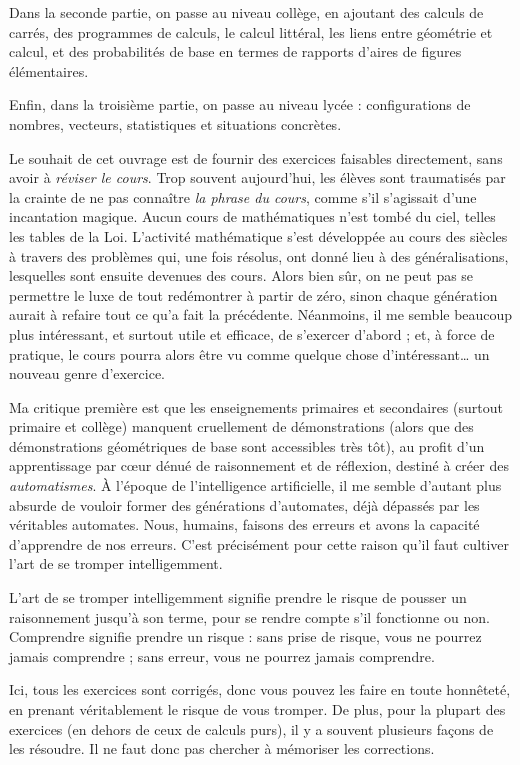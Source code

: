 \documentclass[11pt]{article}
\begin{document}
Dans la seconde partie, on passe au niveau collège, en ajoutant des
calculs de carrés, des programmes de calculs, le calcul littéral, les
liens entre géométrie et calcul, et des probabilités de base en termes
de rapports d’aires de figures élémentaires.


Enfin, dans la troisième partie, on passe au niveau lycée :
configurations de nombres, vecteurs, statistiques et situations
concrètes.


Le souhait de cet ouvrage est de fournir des exercices faisables
directement, sans avoir à \textit{réviser le cours}. Trop souvent
aujourd’hui, les élèves sont traumatisés par la crainte de ne pas
connaître \textit{la phrase du cours}, comme s’il s’agissait
d’une incantation magique. Aucun cours de mathématiques n’est tombé du
ciel, telles les tables de la Loi. L’activité mathématique s’est
développée au cours des siècles à travers des problèmes qui, une fois
résolus, ont donné lieu à des généralisations, lesquelles sont ensuite
devenues des cours. Alors bien sûr, on ne peut pas se permettre le
luxe de tout redémontrer à partir de zéro, sinon chaque génération
aurait à refaire tout ce qu’a fait la précédente. Néanmoins, il me
semble beaucoup plus intéressant, et surtout utile et efficace, de
s’exercer d’abord ; et, à force de pratique, le cours pourra alors
être vu comme quelque chose d’intéressant… un nouveau genre
d’exercice.


Ma critique première est que les enseignements primaires et
secondaires (surtout primaire et collège) manquent cruellement de
démonstrations (alors que des démonstrations géométriques de base sont
accessibles très tôt), au profit d’un apprentissage par cœur dénué de
raisonnement et de réflexion, destiné à créer des
\textit{automatismes}. À l’époque de l’intelligence
artificielle, il me semble d’autant plus absurde de vouloir former des
générations d’automates, déjà dépassés par les véritables
automates. Nous, humains, faisons des erreurs et avons la capacité
d’apprendre de nos erreurs. C’est précisément pour cette raison qu’il
faut cultiver l’art de se tromper intelligemment.


L’art de se tromper intelligemment signifie prendre le risque de
pousser un raisonnement jusqu’à son terme, pour se rendre compte s’il
fonctionne ou non. Comprendre signifie prendre un risque : sans prise
de risque, vous ne pourrez jamais comprendre ; sans erreur, vous ne
pourrez jamais comprendre.


Ici, tous les exercices sont corrigés, donc vous pouvez les faire en
toute honnêteté, en prenant véritablement le risque de vous
tromper. De plus, pour la plupart des exercices (en dehors de ceux de
calculs purs), il y a souvent plusieurs façons de les résoudre. Il ne
faut donc pas chercher à mémoriser les corrections.
\end{document}
